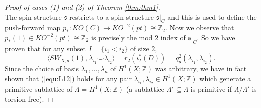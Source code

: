 \documentclass{amsart}
\theoremstyle{definition}
\theoremstyle{remark}
\numberwithin{equation}{section}
\begin{document}
\begin{proof}[Proof of cases (1) and (2) of Theorem \ref{thm:thm1}]
\[\]
The spin structure $\mathfrak{s}$ restricts to a spin structure $\mathfrak{s}|_{C}$ and this is used to define the push-forward map $p_* : KO(C) \to KO^{-2}(pt) \cong \mathbb{Z}_2$. Now we observe that $p_*(1) \in KO^{-2}(pt) \cong \mathbb{Z}_2$ is precisely the mod $2$ index of $\mathfrak{s}|_C$. So we have proven that for any subset $I = \{i_1 < i_2\}$ of size $2$,
\begin{equation}\label{equ:L12}
\langle SW_{X,\mathfrak{s}}(1) , \lambda_{i_1} \smallsmile \lambda_{i_2} \rangle = r_2( \iota_I^*(D) ) = q^2_{\mathfrak{s}}( \lambda_{i_1} ,  \lambda_{i_2} ).
\end{equation}
Since the choice of basis $\lambda_1, \dots , \lambda_n$ of $H^1(X ; \mathbb{Z})$ was arbitrary, we have in fact shown that (\ref{equ:L12}) holds for any pair $\lambda_{i_1}, \lambda_{i_2} \in H^1(X ; \mathbb{Z})$ which generate a primitive sublattice of $\Lambda = H^1(X ; \mathbb{Z})$ (a sublattice $\Lambda' \subseteq \Lambda$ is primitive if $\Lambda/\Lambda'$ is torsion-free).


\end{proof}
\end{document}
